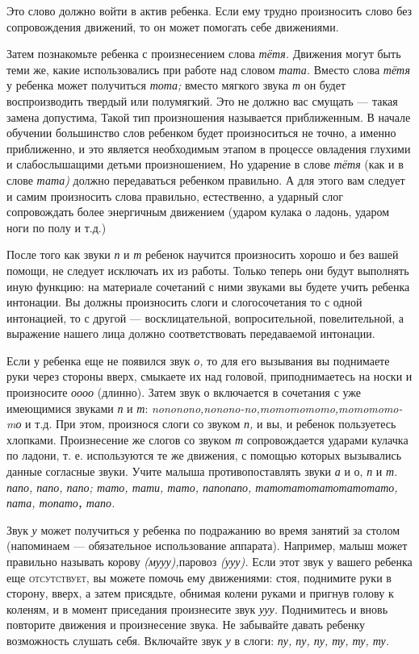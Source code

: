 \documentclass[a5paper]{book}
\renewcommand{\emph}[1]{\textit{#1}}
\begin{document}
Это слово должно войти в актив ребенка. Если ему трудно произносить
слово без сопровождения движений, то он может помогать себе движениями.

Затем познакомьте ребенка с произнесением слова \emph{тётя.} Движения
могут быть теми же, какие использовались при работе над словом
\emph{тата.} Вместо слова \emph{тётя} у ребенка может получиться
\emph{тота;} вместо мягкого звука \emph{т} он будет воспроизводить
твердый или полумягкий. Это не должно вас смущать --- такая замена
допустима, Такой тип произношения называется приближенным. В начале
обучении большинство слов ребенком будет произноситься не точно, а
именно приближенно, и это является необходимым этапом в процессе
овладения глухими и слабослышащими детьми произношением, Но ударение в
слове \emph{тётя} (как и в слове \emph{тата)} должно передаваться
ребенком правильно. А для этого вам следует и самим произносить слова
правильно, естественно, а ударный слог сопровождать более энергичным
движением (ударом кулака о ладонь, ударом ноги по полу и т.д.)

После того как звуки \emph{п} и \emph{т} ребенок научится произносить
хорошо и без вашей помощи, не следует исключать их из работы. Только
теперь они будут выполнять иную функцию: на материале сочетаний с ними
звуками вы будете учить ребенка интонации. Вы должны произносить слоги и
слогосочетания то с одной интонацией, то с другой --- восклицательной,
вопросительной, повелительной, а выражение нашего лица должно
соответствовать передаваемой интонации.

Если у ребенка еще не появился звук \emph{о,} то для его вызывания вы
поднимаете руки через стороны вверх, смыкаете их над головой,
приподнимаетесь на носки и произносите \emph{оооо} (длинно). Затем звук
о включается в сочетания с уже имеющимися звуками \emph{п} и \emph{т}:
\emph{nononono,nonono-no,momomomomo,momomomo-mо} и т.д. При этом,
произнося слоги со звуком \emph{п,} и вы, и ребенок пользуетесь
хлопками. Произнесение же слогов со звуком \emph{т} сопровождается
ударами кулачка по ладони, т. е. используются те же движения, с помощью
которых вызывались данные согласные звуки. Учите малыша
противопоставлять звуки \emph{а} и о, \emph{п} и \emph{т. папо, папо,
папо; тато, тати, тато, папопапо, татотатотатотатотато, пата,
топато\textbf{,} тапо.}

Звук \emph{у} может получиться у ребенка по подражанию во время занятий
за столом (напоминаем --- обязательное использование аппарата).
Например, малыш может правильно называть корову \emph{(мууу),}паровоз
\emph{(ууу).} Если этот звук у вашего ребенка еще \textsc{отсутствует,}
вы можете помочь ему движениями: стоя, поднимите руки в сторону, вверх,
а затем присядьте, обнимая колени руками и пригнув голову к коленям, и в
момент приседания произнесите звук \emph{ууу.} Поднимитесь и вновь
повторите движения и произнесение звука. Не забывайте давать ребенку
возможность слушать себя. Включайте звук \emph{у} в слоги: \emph{пу, пу,
пу, ту, ту, ту.}
\end{document}
